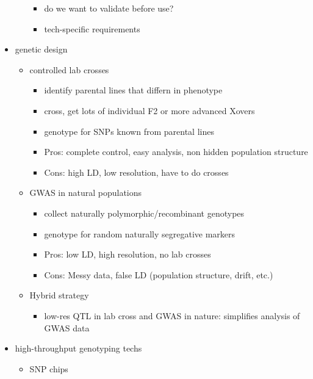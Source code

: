 \documentclass{article}
\begin{document}
\begin{itemize}
\begin{itemize}
\begin{itemize}
                \item do we want to validate before use?
                \item tech-specific requirements
            \end{itemize}
        \end{itemize}
        \item genetic design
        \begin{itemize}
            \item controlled lab crosses
            \begin{itemize}
                \item identify parental lines that differn in phenotype
                \item cross, get lots of individual F2 or more advanced Xovers
                \item genotype for SNPs known from parental lines
                \item Pros: complete control, easy analysis, non hidden population structure
                \item Cons: high LD, low resolution, have to do crosses
            \end{itemize}
            \item GWAS in natural populations
            \begin{itemize}
                \item collect naturally polymorphic/recombinant genotypes
                \item genotype for random naturally segregative markers
                \item Pros: low LD, high resolution, no lab crosses
                \item Cons: Messy data, false LD (population structure, drift, etc.)
            \end{itemize}
            \item Hybrid strategy
            \begin{itemize}
                \item low-res QTL in lab cross and GWAS in nature: simplifies analysis of GWAS data
            \end{itemize}
        \end{itemize}
        \item high-throughput genotyping techs
        \begin{itemize}
            \item SNP chips
            \begin{itemize}

\end{itemize}
\end{itemize}
\end{itemize}
\end{document}
